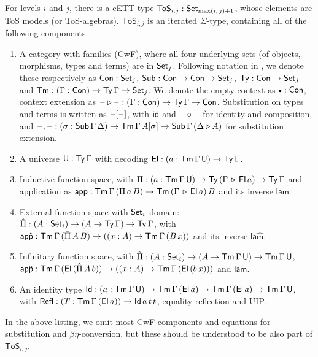 \documentclass[sigplan,review,anonymous]{acmart}\settopmatter{printfolios=true,printccs=false,printacmref=false}
\newcommand{\ToS}{\mathsf{ToS}}
\newcommand{\ext}{\triangleright}
\newcommand{\emptycon}{\scaleobj{.75}\bullet}
\newcommand{\Pii}{\Pi}
\newcommand{\appi}{\mathsf{app}}
\newcommand{\lami}{\mathsf{lam}}
\newcommand{\Pie}{\hat{\Pi}}
\newcommand{\appe}{\mathsf{ap\hat{p}}}
\newcommand{\lame}{\mathsf{la\hat{m}}}
\newcommand{\Piinf}{\tilde{\Pi}}
\newcommand{\appinf}{\mathsf{ap\tilde{p}}}
\newcommand{\laminf}{\mathsf{la\tilde{m}}}
\newcommand{\Refl}{\mathsf{Refl}}
\begin{document}
\begin{definition}\label{def:tos}
For levels $i$ and $j$, there is a cETT type $\ToS_{i,j} : \Set_{\max(i,\,j)+1}$, whose elements are
ToS models (or ToS-algebras). $\ToS_{i,j}$ is an iterated $\Sigma$-type, containing
all of the following components.
\begin{enumerate}
\item
  A category with families (CwF), where all four underlying sets (of objects,
  morphisms, types and terms) are in $\mathsf{Set}_j$. Following notation in
  \cite{kaposi2019constructing}, we denote these respectively as $\mathsf{Con} : \mathsf{Set}_j$, $\mathsf{Sub} : \mathsf{Con} \rightarrow
  \mathsf{Con} \rightarrow \mathsf{Set}_j$, $\mathsf{Ty} : \mathsf{Con} \rightarrow \mathsf{Set}_j$ and $\mathsf{Tm} : (\Gamma : \mathsf{Con}) \rightarrow
  \mathsf{Ty}\,\Gamma \rightarrow \mathsf{Set}_j$. We denote the empty context as $\emptycon : \Con$,
  context extension as $\blank\ext\blank : (\Gamma : \Con)\ra \Ty\,\Gamma \ra
  \Con$.  Substitution on types and terms is written as $\mathord{\hspace{1pt}\text{--}\hspace{1pt}}[\mathord{\hspace{1pt}\text{--}\hspace{1pt}}]$, with
  $\mathsf{id}$ and $\mathord{\hspace{1pt}\text{--}\hspace{1pt}}\circ\mathord{\hspace{1pt}\text{--}\hspace{1pt}}$ for identity and composition, and $\blank,\blank
  : (\sigma : \Sub\,\Gamma\,\Delta)\ra \Tm\,\Gamma\,A[\sigma]\ra
  \Sub\,\Gamma\,(\Delta\ext A)$ for substitution extension.
\item
  A universe $\mathsf{U} : \mathsf{Ty}\,\Gamma$ with decoding $\mathsf{El} : (a : \mathsf{Tm}\,\Gamma\,\mathsf{U}) \rightarrow
  \mathsf{Ty}\,\Gamma$.
\item
  Inductive function space, with $\Pii : (a : \Tm\,\Gamma\,\U) \ra
  \Ty\,(\Gamma\,\ext\,\El\,a) \ra \Ty\,\Gamma$ and application as $\appi :
  \Tm\,\Gamma\,(\Pii\,a\,B)\ra \Tm\,(\Gamma\,\ext\,\El\,a)\,B$ and its
  inverse $\lami$.
\item
  External function space with $\mathsf{Set}_i$ domain: $\Pie : (A : \Set_i)\ra(A \ra
  \Ty\,\Gamma)\ra \Ty\,\Gamma$, with $\appe : \Tm\,\Gamma\,(\Pie\,A\,B)\ra((x :
  A)\ra \Tm\,\Gamma\,(B\,x))$ and its inverse $\lame$.
\item
  Infinitary function space, with $\Piinf : (A : \Set_i)\ra(A \ra
  \Tm\,\Gamma\,\U)\ra \Tm\,\Gamma\,\U$, $\appinf :
  \Tm\,\Gamma\,(\El\,(\Pie\,A\,b))\ra((x : A)\ra \Tm\,\Gamma\,(\El\,(b\,x)))$
  and $\laminf$.
\item
  An identity type $\mathsf{Id} : (a : \mathsf{Tm}\,\Gamma\,\mathsf{U})\rightarrow
  \mathsf{Tm}\,\Gamma\,(\mathsf{El}\,a)\rightarrow\mathsf{Tm}\,\Gamma\,(\mathsf{El}\,a)\rightarrow \mathsf{Tm}\,\Gamma\,\mathsf{U}$, with
  $\Refl : (T : \Tm\,\Gamma\,(\El\,a))\ra \Id\,a\,t\,t$, equality reflection
  and UIP.
\end{enumerate}
\end{definition}
In the above listing, we omit most CwF components and equations for substitution and
$\beta\eta$-conversion, but these should be understood to be also part of $\ToS_{i,j}$.
\end{document}
